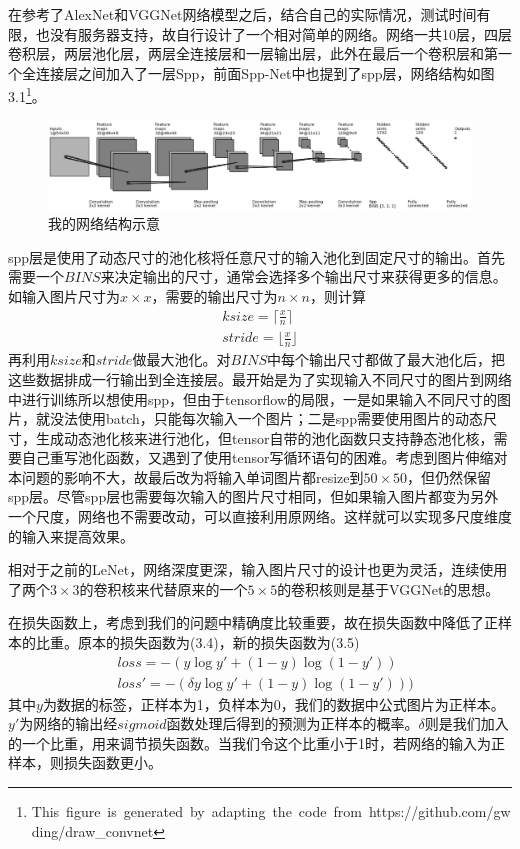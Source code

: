 在参考了AlexNet和VGGNet网络模型之后，结合自己的实际情况，测试时间有限，也没有服务器支持，故自行设计了一个相对简单的网络。网络一共10层，四层卷积层，两层池化层，两层全连接层和一层输出层，此外在最后一个卷积层和第一个全连接层之间加入了一层Spp，前面Spp-Net中也提到了spp层，网络结构如图3.1\footnote{\hbox{This figure is generated by adapting the code from https://github.com/gwding/draw\_convnet}}。
\begin{figure}[ht]
    \centering
    \hbox{\includegraphics[width=\textwidth]{eps/mynet.eps}}
    \caption{我的网络结构示意}
    \label{fig:label}
\end{figure}
spp层是使用了动态尺寸的池化核将任意尺寸的输入池化到固定尺寸的输出。首先需要一个$BINS$来决定输出的尺寸，通常会选择多个输出尺寸来获得更多的信息。如输入图片尺寸为$x \times x$，需要的输出尺寸为$n \times n$，则计算
\begin{align}
    ksize = \lceil \frac x n \rceil \\
    stride = \lfloor \frac x n \rfloor
\end{align}
再利用$ksize$和$stride$做最大池化。对$BINS$中每个输出尺寸都做了最大池化后，把这些数据排成一行输出到全连接层。\parencite{spp}最开始是为了实现输入不同尺寸的图片到网络中进行训练所以想使用spp，但由于tensorflow的局限，一是如果输入不同尺寸的图片，就没法使用batch，只能每次输入一个图片；二是spp需要使用图片的动态尺寸，生成动态池化核来进行池化，但tensor自带的池化函数只支持静态池化核，需要自己重写池化函数，又遇到了使用tensor写循环语句的困难。考虑到图片伸缩对本问题的影响不大，故最后改为将输入单词图片都resize到$50 \times 50$，但仍然保留spp层。尽管spp层也需要每次输入的图片尺寸相同，但如果输入图片都变为另外一个尺度，网络也不需要改动，可以直接利用原网络。这样就可以实现多尺度维度的输入来提高效果。

相对于之前的LeNet，网络深度更深，输入图片尺寸的设计也更为灵活，连续使用了两个$3 \times 3$的卷积核来代替原来的一个$5 \times 5$的卷积核则是基于VGGNet的思想。

在损失函数上，考虑到我们的问题中精确度比较重要，故在损失函数中降低了正样本的比重。原本的损失函数为(3.4)，新的损失函数为(3.5)
\begin{align}
    &loss = - (y \log y' + (1 - y) \log(1 - y')) \\
    &loss' = - (\delta y \log y' +(1 - y) \log(1 - y'))) 
\end{align}
其中$y$为数据的标签，正样本为1，负样本为0，我们的数据中公式图片为正样本。$y'$为网络的输出经$sigmoid$函数处理后得到的预测为正样本的概率。$\delta$则是我们加入的一个比重，用来调节损失函数。当我们令这个比重小于1时，若网络的输入为正样本，则损失函数更小。

